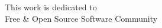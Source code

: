 
\begin{dedication} %

This work is dedicated to \\ Free \& Open Source Software Community

\end{dedication}


